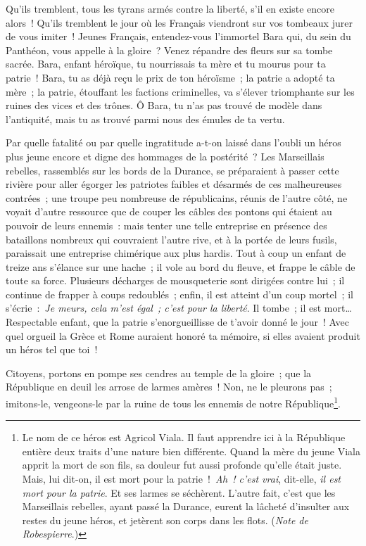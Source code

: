 \documentclass[french,twoside]{book} %
\begin{document}
Qu’ils tremblent, tous les tyrans armés contre la liberté, s’il en existe encore alors ! Qu’ils tremblent le jour où les Français viendront sur vos tombeaux jurer de vous imiter ! Jeunes Français, entendez-vous l’immortel Bara qui, du sein du Panthéon, vous appelle à la gloire ? Venez répandre des fleurs sur sa tombe sacrée. Bara, enfant héroïque, tu nourrissais ta mère et tu mourus pour ta patrie ! Bara, tu as déjà reçu le prix de ton héroïsme ; la patrie a adopté ta mère ; la patrie, étouffant les factions criminelles, va s’élever triomphante sur les ruines des vices et des trônes. Ô Bara, tu n’as pas trouvé de modèle dans l’antiquité, mais tu as trouvé parmi nous des émules de ta vertu.\par
Par quelle fatalité ou par quelle ingratitude a-t-on laissé dans l’oubli un héros plus jeune encore et digne des hommages de la postérité ? Les Marseillais rebelles, rassemblés sur les bords de la Durance, se préparaient à passer cette rivière pour aller égorger les patriotes faibles et désarmés de ces malheureuses contrées ; une troupe peu nombreuse de républicains, réunis de l’autre côté, ne voyait d’autre ressource que de couper les câbles des pontons qui étaient au pouvoir de leurs ennemis : mais tenter une telle entreprise en présence des bataillons nombreux qui couvraient l’autre rive, et à la portée de leurs fusils, paraissait une entreprise chimérique aux plus hardis. Tout à coup un enfant de treize ans s’élance sur une hache ; il vole au bord du fleuve, et frappe le câble de toute sa force. Plusieurs décharges de mousqueterie sont dirigées contre lui ; il continue de frapper à coups redoublés ; enfin, il est atteint d’un coup mortel ; il s’écrie : {\itshape Je meurs, cela m’est égal ; c’est pour la liberté}. Il tombe ; il est mort… Respectable enfant, que la patrie s’enorgueillisse de t’avoir donné le jour ! Avec quel orgueil la Grèce et Rome auraient honoré ta mémoire, si elles avaient produit un héros tel que toi !\par
Citoyens, portons en pompe ses cendres au temple de la gloire ; que la République en deuil les arrose de larmes amères ! Non, ne le pleurons pas ; imitons-le, vengeons-le par la ruine de tous les ennemis de notre République\footnote{Le nom de ce héros est Agricol Viala. Il faut apprendre ici à la République entière deux traits d’une nature bien différente. Quand la mère du jeune Viala apprit la mort de son fils, sa douleur fut aussi profonde qu’elle était juste. Mais, lui dit-on, il est mort pour la patrie ! {\itshape Ah ! c’est vrai}, dit-elle, {\itshape il est mort pour la patrie}. Et ses larmes se séchèrent. L’autre fait, c’est que les Marseillais rebelles, ayant passé la Durance, eurent la lâcheté d’insulter aux restes du jeune héros, et jetèrent son corps dans les flots. ({\itshape Note de Robespierre}.)}.\par
\end{document}

